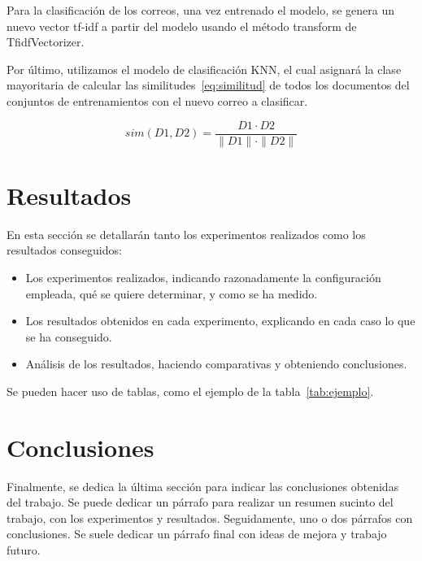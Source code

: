 \documentclass[conference,a4paper]{IEEEtran}
\begin{document}
Para la clasificación de los correos, una vez entrenado el modelo, se genera un nuevo vector tf-idf a partir del modelo usando el método transform de TfidfVectorizer.

Por último, utilizamos el modelo de clasificación KNN, el cual asignará la clase mayoritaria de calcular las similitudes~\eqref{eq:similitud} de todos los documentos del conjuntos de entrenamientos con el nuevo correo a clasificar. 


\begin{center}
    \begin{equation}
        \label{eq:similitud}
         sim(D1,D2) = \dfrac{D1 \cdot D2}{{\|D1\| \cdot \|D2\|}} 
    \end{equation}
\end{center}


\section{Resultados}
En esta sección se detallarán tanto los experimentos realizados como los
resultados conseguidos:
\begin{itemize}
\item Los experimentos realizados, indicando razonadamente la configuración
  empleada, qué se quiere determinar, y como se ha medido.
\item Los resultados obtenidos en cada experimento, explicando en cada caso lo
  que se ha conseguido.
\item Análisis de los resultados, haciendo comparativas y obteniendo
  conclusiones.
\end{itemize}

Se pueden hacer uso de tablas, como el ejemplo de la tabla~\ref{tab:ejemplo}.




\section{Conclusiones}

Finalmente, se dedica la última sección para indicar las conclusiones obtenidas
del trabajo. Se puede dedicar un párrafo para realizar un resumen sucinto del
trabajo, con los experimentos y resultados. Seguidamente, uno o dos párrafos
con conclusiones. Se suele dedicar un párrafo final con ideas de mejora y
trabajo futuro.
\end{document}
